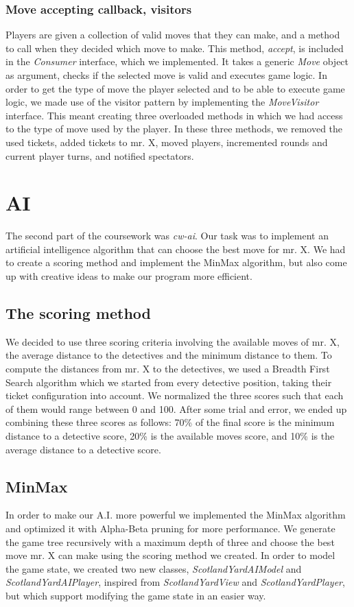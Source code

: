 \documentclass[12pt,a4paper]{scrartcl}
\begin{document}
\subsubsection*{Move accepting callback, visitors}
Players are given a collection of valid moves that they can make, and a method to call when they decided which move to make. This method, \textit{accept},  is included in the \textit{Consumer} interface, which we implemented. It takes a generic \textit{Move} object as argument, checks if the selected move is valid and executes game logic. In order to get the type of move the player selected and to be able to execute game logic, we made use of the visitor pattern by implementing the \textit{MoveVisitor} interface. This meant creating three overloaded methods in which we had access to the type of move used by the player. In these three methods, we removed the used tickets, added tickets to mr. X, moved players, incremented rounds and current player turns, and notified spectators.

\section{AI}
The second part of the coursework was \textit{cw-ai}. Our task was to implement an artificial intelligence algorithm that can choose the best move for mr. X. We had to create a scoring method and implement the MinMax algorithm, but also come up with creative ideas to make our program more efficient.

\subsection*{The scoring method}
We decided to use three scoring criteria involving the available moves of mr. X, the average distance to the detectives and the minimum distance to them. To compute the distances from mr. X to the detectives, we used a Breadth First Search algorithm which we started from every detective position, taking their ticket configuration into account.
We normalized the three scores such that each of them would range between 0 and 100. After some trial and error, we ended up combining these three scores as follows: 70\% of the final score is the minimum distance to a detective score, 20\% is the available moves score, and 10\% is the average distance to a detective score.

\subsection*{MinMax}
In order to make our A.I. more powerful we implemented the MinMax algorithm and optimized it with Alpha-Beta pruning for more performance. We generate the game tree recursively with a maximum depth of three and choose the best move mr. X can make using the scoring method we created. In order to model the game state, we created two new classes, \textit{ScotlandYardAIModel} and \textit{ScotlandYardAIPlayer}, inspired from \textit{ScotlandYardView} and \textit{ScotlandYardPlayer}, but which support modifying the game state in an easier way.
\end{document}

